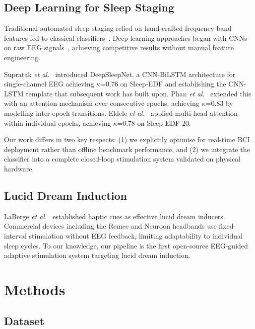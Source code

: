 \documentclass[journal]{IEEEtran}
\begin{document}
\subsection{Deep Learning for Sleep Staging}

Traditional automated sleep staging relied on
hand-crafted frequency band features fed to classical
classifiers~\cite{rechtschaffen1968}.
Deep learning approaches began with CNNs on raw
EEG signals~\cite{tsinalis2016}, achieving competitive
results without manual feature engineering.

Supratak \emph{et al.}~\cite{supratak2017} introduced
DeepSleepNet, a CNN-BiLSTM architecture for
single-channel EEG achieving $\kappa$=0.76 on
Sleep-EDF and establishing the CNN-LSTM template
that subsequent work has built upon.
Phan \emph{et al.}~\cite{phan2019} extended this with
an attention mechanism over consecutive epochs,
achieving $\kappa$=0.83 by modelling inter-epoch
transitions.
Eldele \emph{et al.}~\cite{eldele2021} applied
multi-head attention within individual epochs,
achieving $\kappa$=0.78 on Sleep-EDF-20.

Our work differs in two key respects:
(1) we explicitly optimise for real-time BCI deployment
rather than offline benchmark performance, and
(2) we integrate the classifier into a complete
closed-loop stimulation system validated on
physical hardware.

\subsection{Lucid Dream Induction}

LaBerge \emph{et al.}~\cite{laberge2018} established
haptic cues as effective lucid dream inducers.
Commercial devices including the Remee and Neuroon
headbands use fixed-interval stimulation without EEG
feedback, limiting adaptability to individual sleep
cycles.
To our knowledge, our pipeline is the first
open-source EEG-guided adaptive stimulation system
targeting lucid dream induction.

\FloatBarrier
\section{Methods}
\label{sec:methods}

\subsection{Dataset}
\end{document}
